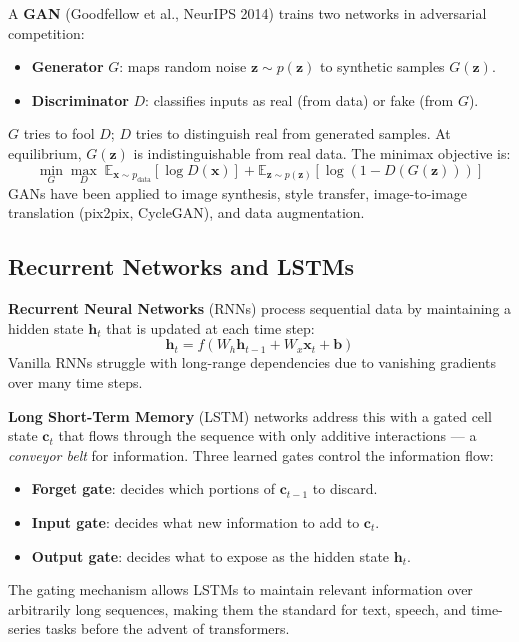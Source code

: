 \documentclass[11pt,a4paper]{article}
\theoremstyle{definition}
\theoremstyle{plain}
\theoremstyle{remark}
\begin{document}
A \textbf{GAN} (Goodfellow et al., NeurIPS 2014) trains two networks in adversarial competition:
\begin{itemize}
    \item \textbf{Generator} $G$: maps random noise $\mathbf{z} \sim p(\mathbf{z})$ to synthetic samples $G(\mathbf{z})$.
    \item \textbf{Discriminator} $D$: classifies inputs as real (from data) or fake (from $G$).
\end{itemize}
$G$ tries to fool $D$; $D$ tries to distinguish real from generated samples. At equilibrium, $G(\mathbf{z})$ is indistinguishable from real data. The minimax objective is:
\[
    \min_G \max_D \;\mathbb{E}_{\mathbf{x} \sim p_{\text{data}}}[\log D(\mathbf{x})] + \mathbb{E}_{\mathbf{z} \sim p(\mathbf{z})}[\log(1 - D(G(\mathbf{z})))]
\]
GANs have been applied to image synthesis, style transfer, image-to-image translation (pix2pix, CycleGAN), and data augmentation.

\subsection{Recurrent Networks and LSTMs}

\textbf{Recurrent Neural Networks} (RNNs) process sequential data by maintaining a hidden state $\mathbf{h}_t$ that is updated at each time step:
\[
    \mathbf{h}_t = f(W_h \mathbf{h}_{t-1} + W_x \mathbf{x}_t + \mathbf{b})
\]
Vanilla RNNs struggle with long-range dependencies due to vanishing gradients over many time steps.

\textbf{Long Short-Term Memory} (LSTM) networks address this with a gated cell state $\mathbf{c}_t$ that flows through the sequence with only additive interactions --- a \emph{conveyor belt} for information. Three learned gates control the information flow:
\begin{itemize}
    \item \textbf{Forget gate}: decides which portions of $\mathbf{c}_{t-1}$ to discard.
    \item \textbf{Input gate}: decides what new information to add to $\mathbf{c}_t$.
    \item \textbf{Output gate}: decides what to expose as the hidden state $\mathbf{h}_t$.
\end{itemize}
The gating mechanism allows LSTMs to maintain relevant information over arbitrarily long sequences, making them the standard for text, speech, and time-series tasks before the advent of transformers.
\end{document}
